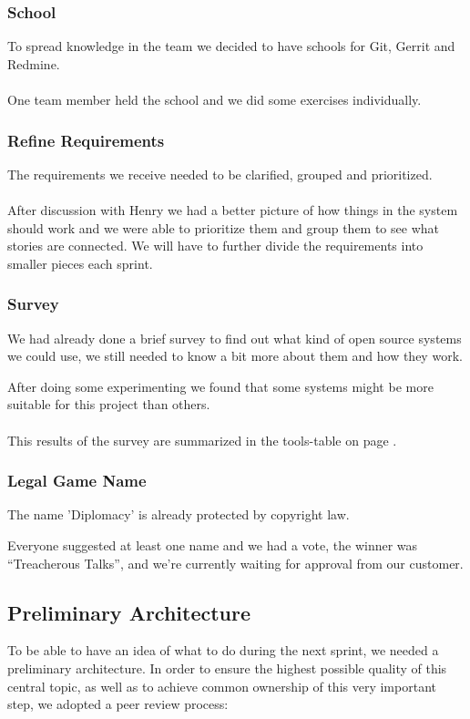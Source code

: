 \documentclass[11pt,a4paper]{article}
\begin{document}
\subsubsection{School}
To spread knowledge in the team we decided to have schools for Git, Gerrit and Redmine.
\\
\\
One team member held the school and we did some exercises individually.

\subsubsection{Refine Requirements}
The requirements we receive needed to be clarified, grouped and prioritized.
\\
\\
After discussion with Henry we had a better picture of how things in the system should work
and we were able to prioritize them and group them to see what stories are connected.
We will have to further divide the requirements into smaller pieces each sprint. 

\subsubsection{Survey}
We had already done a brief survey to find out what kind of open source systems we could use, 
we still needed to know a bit more about them and how they work.

After doing some experimenting we found that some systems might be more suitable for this project than others.
\\
\\
This results of the survey are summarized in the tools-table on page \pageref{tbl:tools}.

\subsubsection{Legal Game Name}
The name 'Diplomacy' is already protected by copyright law.

Everyone suggested at least one name and we had a vote, the winner was ``Treacherous Talks'', 
and we're currently waiting for approval from our customer.

\subsection{Preliminary Architecture}
To be able to have an idea of what to do during the next sprint, we needed a preliminary architecture.
In order to ensure the highest possible quality of this central topic, 
as well as to achieve common ownership of this very important step, we adopted a peer review process:
\end{document}
